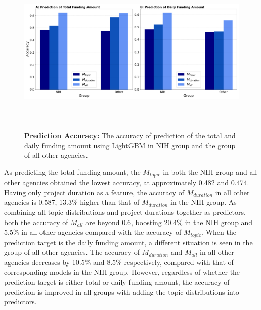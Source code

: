 \begin{figure}[H]
    \centering
    \includegraphics[width = 17cm, height = 8cm]{Code/img/accuracy_daily.pdf}
    \caption[The accuracy of prediction of funding amount using LightGBM]{\textbf{Prediction Accuracy:} The accuracy of prediction of the total and daily funding amount using LightGBM in NIH group and the group of all other agencies.}
\end{figure}

As predicting the total funding amount, the $M_{topic}$ in both the NIH group and all other agencies obtained the lowest accuracy, at approximately 0.482 and 0.474. Having only project duration as a feature, the accuracy of $M_{duration}$ in all other agencies is 0.587, 13.3\% higher than that of $M_{duration}$ in the NIH group. As combining all topic distributions and project durations together as predictors, both the accuracy of $M_{all}$ are beyond 0.6, boosting 20.4\% in the NIH group and 5.5\% in all other agencies compared with the accuracy of $M_{topic}$. When the prediction target is the daily funding amount, a different situation is seen in the group of all other agencies. The accuracy of $M_{duration}$ and $M_{all}$ in all other agencies decreases by 10.5\% and 8.5\% respectively, compared with that of corresponding models in the NIH group. However, regardless of whether the prediction target is either total or daily funding amount, the accuracy of prediction is improved in all groups with adding the topic distributions into predictors.
